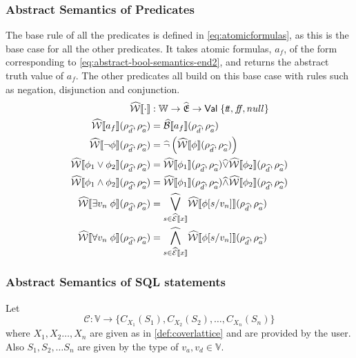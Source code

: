 \subsubsection{Abstract Semantics of Predicates}
The base rule of all the predicates is defined in \autoref{eq:atomicformulas}, as this is the base case for all the other predicates.
It takes atomic formulas, $a_f$, of the form corresponding to \autoref{eq:abstract-bool-semantics-end2}, and returns the abstract truth value of $a_f$.
The other predicates all build on this base case with rules such as negation, disjunction and conjunction.
\begin{align}
    \abspredsem{\cdot} &: \mathbb{W} \rightarrow \ab{\mathfrak{E}} \rightarrow \mathsf{Val} \; \{\true, \false, \mnull\} \\ \label{eq:atomicformulas}
    \abspredsem{a_f}(\rho_{\ab{d}}, \rho_{\ab{a}}) &= \absboolsem{a_f}(\rho_{\ab{d}}, \rho_{\ab{a}}) \\
    \abspredsem{\neg \phi}(\rho_{\ab{d}}, \rho_{\ab{a}}) &= \ab{\neg} \left( \abspredsem{\phi}(\rho_{\ab{d}}, \rho_{\ab{a}}) \right) \\
    \abspredsem{\phi_1 \lor \phi_2}(\rho_{\ab{d}}, \rho_{\ab{a}}) &= \abspredsem{\phi_1}(\rho_{\ab{d}}, \rho_{\ab{a}}) \ab{\lor} \abspredsem{\phi_2}(\rho_{\ab{d}}, \rho_{\ab{a}}) \\
    \abspredsem{\phi_1 \land \phi_2}(\rho_{\ab{d}}, \rho_{\ab{a}}) &= \abspredsem{\phi_1}(\rho_{\ab{d}}, \rho_{\ab{a}}) \ab{\land} \abspredsem{\phi_2}(\rho_{\ab{d}}, \rho_{\ab{a}}) \\
    \abspredsem{\exists v_n \; \phi}(\rho_{\ab{d}}, \rho_{\ab{a}}) &= \underset{s \in \absexpsem{x}}{\ab{\bigvee}} \abspredsem{\phi[s/v_n]}(\rho_{\ab{d}}, \rho_{\ab{a}}) \\
    \abspredsem{\forall v_n \; \phi}(\rho_{\ab{d}}, \rho_{\ab{a}}) &= \underset{s \in \absexpsem{x}}{\ab{\bigwedge}} \abspredsem{\phi[s/v_n]}(\rho_{\ab{d}}, \rho_{\ab{a}})
\end{align}

\subsubsection{Abstract Semantics of SQL statements}

Let
\begin{equation}
    \mathcal{C} : \mathbb{V} \rightarrow \{ C_{X_1}(S_1), C_{X_2}(S_2), \dots, C_{X_n}(S_n) \}
\end{equation}
where $X_1, X_2 \dots ,X_n$ are given as in \autoref{def:coverlattice} and are provided by the user.
Also $S_1, S_2, \dots S_n$ are given by the type of $v_a, v_d \in \mathbb{V}$.

